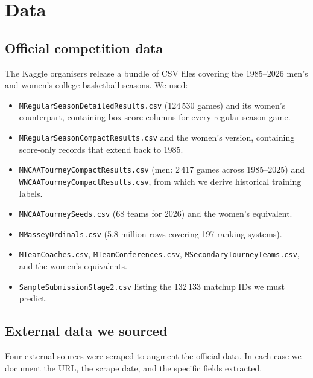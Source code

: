 \documentclass[11pt, a4paper]{article}
\begin{document}
\section{Data}
\label{sec:data}

\subsection{Official competition data}
The Kaggle organisers release a bundle of CSV files covering the 1985--2026 men's and women's college basketball seasons. We used:
\begin{itemize}[leftmargin=*]
    \item \texttt{MRegularSeasonDetailedResults.csv} (124\,530 games) and its women's counterpart, containing box-score columns for every regular-season game.
    \item \texttt{MRegularSeasonCompactResults.csv} and the women's version, containing score-only records that extend back to 1985.
    \item \texttt{MNCAATourneyCompactResults.csv} (men: 2\,417 games across 1985--2025) and \texttt{WNCAATourneyCompactResults.csv}, from which we derive historical training labels.
    \item \texttt{MNCAATourneySeeds.csv} (68 teams for 2026) and the women's equivalent.
    \item \texttt{MMasseyOrdinals.csv} (5.8 million rows covering 197 ranking systems).
    \item \texttt{MTeamCoaches.csv}, \texttt{MTeamConferences.csv}, \texttt{MSecondaryTourneyTeams.csv}, and the women's equivalents.
    \item \texttt{SampleSubmissionStage2.csv} listing the 132\,133 matchup IDs we must predict.
\end{itemize}

\subsection{External data we sourced}
\label{sec:external-data}

Four external sources were scraped to augment the official data. In each case we document the URL, the scrape date, and the specific fields extracted.
\end{document}
